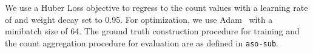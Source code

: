 \documentclass[10pt,twocolumn,letterpaper]{article}
\newcommand{\sub}{\texttt{aso-sub}\xspace}
\begin{document}
We use a Huber Loss objective to regress to the count values with a learning rate of  and weight decay set to 0.95. For optimization, we use Adam~\cite{KingmaB14} with a minibatch size of 64. The ground truth construction procedure for training and the count aggregation procedure for evaluation are as defined in \sub.







\begin{comment}
\subsection{Counting by Glancing}
\begin{itemize}
\item Train a Neural network and an SVR to regress to counts
\item Take fc7 features, add a single hidden layer and no-hidden layers to get counts
\item Given an image network produces a  dimensional vector indicating counts for various categories
\item Trained with batch-normalization
\item Used an RBF kernel SVR on the fc7 features to regress to counts
\item found that both the SVR and NN performed nearly same, but NN was much faster to train
\item Thus use NN for the rest of the experiments in the paper
\end{itemize}
\end{comment}
\end{document}
